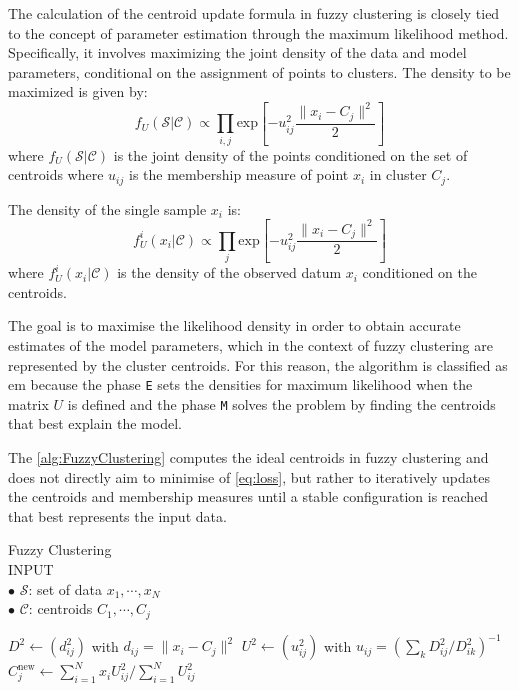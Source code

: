 \begin{remark}
	The calculation of the centroid update formula in fuzzy clustering is closely tied to the concept of parameter estimation through the maximum likelihood method. Specifically, it involves maximizing the joint density of the data and model parameters, conditional on the assignment of points to clusters.
	The density to be maximized is given by:
	\begin{equation*}
	    f_U(\mathcal{S}|\mathcal{C}) \propto \prod_{i,j}\text{exp}\left[-u_{ij}^2\frac{\|x_i-C_j\|^2}{2}\right]
	\end{equation*}
	where $f_U(\mathcal{S}|\mathcal{C})$ is the joint density of the points conditioned on the set of centroids where $u_{ij}$ is the membership measure of point $x_i$ in cluster $C_j$.

	\noindent The density of the single sample $x_i$ is:
	\begin{equation*}
	    f_U^i(x_i|\mathcal{C}) \propto \prod_{j}\text{exp}\left[-u_{ij}^2\frac{\|x_i-C_j\|^2}{2}\right]
	\end{equation*}
	where $f_U^i(x_i|\mathcal{C})$ is the density of the observed datum $x_i$ conditioned on the centroids.

	\noindent The goal is to maximise the likelihood density in order to obtain accurate estimates of the model parameters, which in the context of fuzzy clustering are represented by the cluster centroids. For this reason, the algorithm is classified as \gls{em} because the phase \verb"E" sets the densities for maximum likelihood when the matrix $U$ is defined and the phase \verb"M" solves the problem by finding the centroids that best explain the model.
\end{remark}

The \cref{alg:FuzzyClustering} computes the ideal centroids in fuzzy clustering and does not directly aim to minimise of \cref{eq:loss}, but rather to iteratively updates the centroids and membership measures until a stable configuration is reached that best represents the input data.

\begin{algorithm}[h]
\caption{Fuzzy Clustering\\
	\textsc{INPUT}\\
	$\bullet$ $\mathcal{S}$: set of data $x_1,\cdots,x_N$\\
	$\bullet$ $\mathcal{C}$: centroids $C_1,\cdots,C_j$}
\begin{algorithmic}[1]
        \State $D^2 \gets (d^2_{ij})$ with $d_{ij}=\|x_i-C_j\|^2$
        \State $U^2 \gets (u_{ij}^2)$ with $u_{ij}=\left(\sum_{k}D^2_{ij}/D^2_{ik}\right)^{-1}$
            \State $C^\text{new}_j \gets \sum_{i=1}^N x_iU^2_{ij} / \sum_{i=1}^N U^2_{ij}$
        \EndFor
    \EndWhile
\EndProcedure
\end{algorithmic}
\label{alg:FuzzyClustering}
\end{algorithm}

